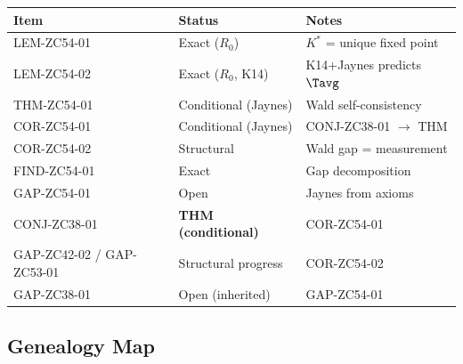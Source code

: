 \documentclass[12pt, a4paper]{article}
\begin{document}
\begin{center}
\begin{tabular}{@{}lp{4cm}p{5cm}@{}}
\toprule
\textbf{Item} & \textbf{Status} & \textbf{Notes} \\
\midrule
LEM-ZC54-01 & Exact ($R_0$) & $K^*$ = unique fixed point \\
LEM-ZC54-02 & Exact ($R_0$, K14) & K14+Jaynes predicts $\Tavg$ \\
THM-ZC54-01 & Conditional (Jaynes) & Wald self-consistency \\
COR-ZC54-01 & Conditional (Jaynes) & CONJ-ZC38-01 $\to$ THM \\
COR-ZC54-02 & Structural & Wald gap = measurement \\
FIND-ZC54-01 & Exact & Gap decomposition \\
GAP-ZC54-01 & Open & Jaynes from axioms \\
\midrule
CONJ-ZC38-01 & \textbf{THM (conditional)} & COR-ZC54-01 \\
GAP-ZC42-02 / GAP-ZC53-01 & Structural progress & COR-ZC54-02 \\
GAP-ZC38-01 & Open (inherited) & GAP-ZC54-01 \\
\bottomrule
\end{tabular}
\end{center}

\subsection{Genealogy Map}
\end{document}
